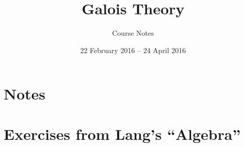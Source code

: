 \documentclass[11pt, reqno]{article}
\title{Galois Theory}
\author{Course Notes}
\date{22 February 2016 -- 24 April 2016}
\numberwithin{equation}{section}
\numberwithin{figure}{section}
\theoremstyle{plain}
\theoremstyle{definition}
\theoremstyle{remark}
\begin{document}
\maketitle

\tableofcontents
\newpage

\part{Notes}          %


\part{Exercises from Lang's ``Algebra''}
%
%
%
\end{document}
